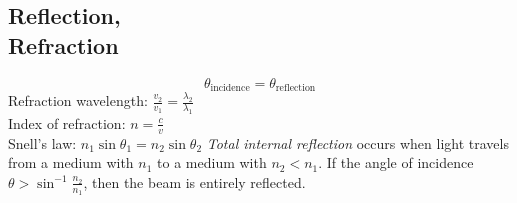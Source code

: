\subsection{Reflection,\\ Refraction}
$$\theta_{\text{incidence}}=\theta_{\text{reflection}}$$
Refraction wavelength: $\frac{v_2}{v_1}=\frac{\lambda_2}{\lambda_1}$\\
Index of refraction: $n=\frac{c}{v}$\\
Snell's law: $n_1\sin\theta_1=n_2\sin\theta_2$
\emph{Total internal reflection} occurs when light travels from a medium with $n_1$ to a medium with $n_2<n_1$. If the angle of incidence $\theta>\sin^{-1}{\frac{n_2}{n_1}}$, then the beam is entirely reflected.

